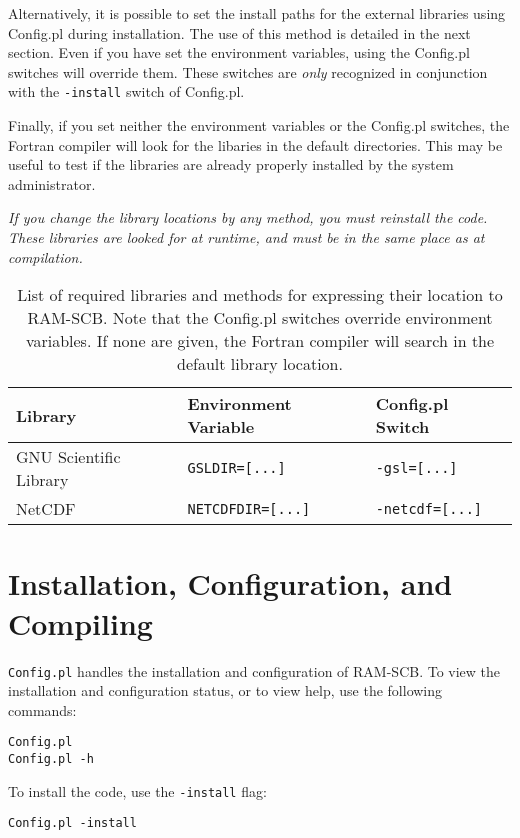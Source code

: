 Alternatively, it is possible to set the install paths for the external libraries using Config.pl during installation. The use of this method is detailed in the next section. Even if you have set the environment variables, using the Config.pl switches will override them. These switches are \emph{only} recognized in conjunction with the {\tt -install} switch of Config.pl.

Finally, if you set neither the environment variables or the Config.pl switches, the Fortran compiler will look for the libaries in the default directories. This may be useful to test if the libraries are already properly installed by the system administrator.  

\emph{If you change the library locations by any method, you must reinstall the code. These libraries are looked for at runtime, and must be in the same place as at compilation.} 

\begin{table}[ht]
  \centering
  \begin{tabular}{l l l}
  \hline\hline
  Library & Environment Variable & Config.pl Switch\\
  \hline
  GNU Scientific Library & {\tt GSLDIR=[...]} & {\tt -gsl=[...]}\\
  NetCDF & {\tt NETCDFDIR=[...]} & {\tt -netcdf=[...]}\\
  \end{tabular}
\caption{List of required libraries and methods for expressing their location to RAM-SCB. Note that the Config.pl switches override environment variables. If none are given, the Fortran compiler will search in the default library location.}
\label{tab:libs}
\end{table}

\section{Installation, Configuration, and Compiling \label{subchap:install}}
{\tt Config.pl} handles the installation and configuration of RAM-SCB. To view the installation and configuration status, or to view help, use the following commands:
\begin{verbatim}
Config.pl
Config.pl -h
\end{verbatim}

To install the code, use the {\tt -install} flag:

\begin{verbatim}
Config.pl -install
\end{verbatim}


